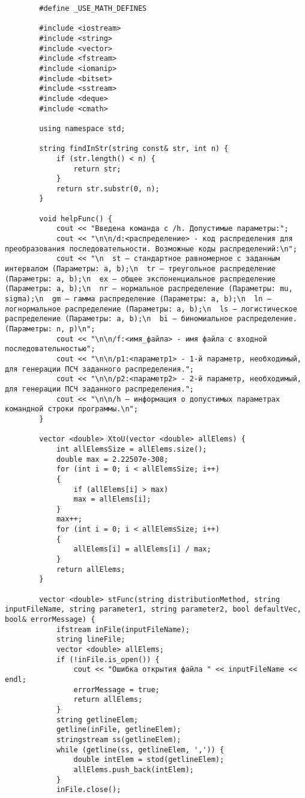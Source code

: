 \documentclass[bachelor, och, coursework]{shiza}
\begin{document}
	\begin{verbatim}
		#define _USE_MATH_DEFINES
		
		#include <iostream>
		#include <string>
		#include <vector>
		#include <fstream>
		#include <iomanip>
		#include <bitset>
		#include <sstream>
		#include <deque>
		#include <cmath>
		
		using namespace std;
		
		string findInStr(string const& str, int n) {
			if (str.length() < n) {
				return str;
			}
			return str.substr(0, n);
		}
		
		void helpFunc() {
			cout << "Введена команда c /h. Допустимые параметры:";
			cout << "\n\n/d:<распределение> - код распределения для преобразования последовательности. Возможные коды распределений:\n";
			cout << "\n  st – стандартное равномерное с заданным интервалом (Параметры: a, b);\n  tr – треугольное распределение (Параметры: a, b);\n  ex – общее экспоненциальное распределение (Параметры: a, b);\n  nr – нормальное распределение (Параметры: mu, sigma);\n  gm – гамма распределение (Параметры: a, b);\n  ln – логнормальное распределение (Параметры: a, b);\n  ls – логистическое распределение (Параметры: a, b);\n  bi – биномиальное распределение. (Параметры: n, p)\n";
			cout << "\n\n/f:<имя_файла> - имя файла с входной последовательностью";
			cout << "\n\n/p1:<параметр1> - 1-й параметр, необходимый, для генерации ПСЧ заданного распределения.";
			cout << "\n\n/p2:<параметр2> - 2-й параметр, необходимый, для генерации ПСЧ заданного распределения.";
			cout << "\n\n/h – информация о допустимых параметрах командной строки программы.\n";
		}
		
		vector <double> XtoU(vector <double> allElems) {
			int allElemsSize = allElems.size();
			double max = 2.22507e-308;
			for (int i = 0; i < allElemsSize; i++)
			{
				if (allElems[i] > max)
				max = allElems[i];
			}
			max++;
			for (int i = 0; i < allElemsSize; i++)
			{
				allElems[i] = allElems[i] / max;
			}
			return allElems;
		}
		
		vector <double> stFunc(string distributionMethod, string inputFileName, string parameter1, string parameter2, bool defaultVec, bool& errorMessage) {
			ifstream inFile(inputFileName);
			string lineFile;
			vector <double> allElems;
			if (!inFile.is_open()) {
				cout << "Ошибка открытия файла " << inputFileName << endl;
				errorMessage = true;
				return allElems;
			}
			string getlineElem;
			getline(inFile, getlineElem);
			stringstream ss(getlineElem);
			while (getline(ss, getlineElem, ',')) {
				double intElem = stod(getlineElem);
				allElems.push_back(intElem);
			}
			inFile.close();
			

\end{verbatim}
\end{document}
